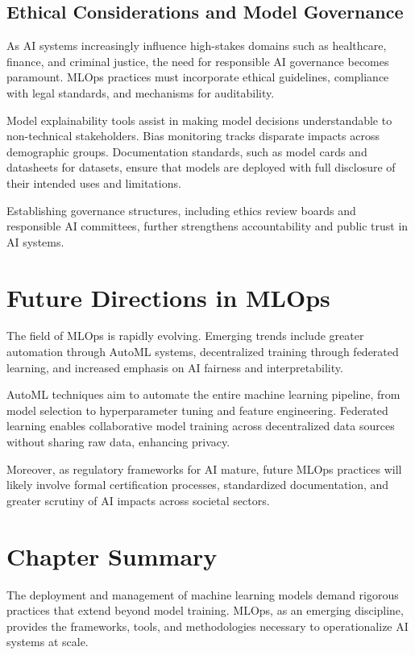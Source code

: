 \documentclass[openany]{book}
\begin{document}
\subsection{Ethical Considerations and Model Governance}
As AI systems increasingly influence high-stakes domains such as healthcare, 
finance, and criminal justice, the need for responsible AI governance becomes 
paramount. MLOps practices must incorporate ethical guidelines, compliance with 
legal standards, and mechanisms for auditability.

Model explainability tools assist in making model decisions understandable to
non-technical stakeholders. Bias monitoring tracks disparate impacts across 
demographic groups. Documentation standards, such as model cards and datasheets 
for datasets, ensure that models are deployed with full disclosure of their 
intended uses and limitations.

Establishing governance structures, including ethics review boards and 
responsible AI committees, further strengthens accountability and public trust 
in AI systems.

\section{Future Directions in MLOps}

The field of MLOps is rapidly evolving. Emerging trends include greater 
automation through AutoML systems, decentralized training through federated 
learning, and increased emphasis on AI fairness and interpretability.

AutoML techniques aim to automate the entire machine learning pipeline, from 
model selection to hyperparameter tuning and feature engineering. Federated 
learning enables collaborative model training across decentralized data sources 
without sharing raw data, enhancing privacy.

Moreover, as regulatory frameworks for AI mature, future MLOps practices will 
likely involve formal certification processes, standardized documentation, and 
greater scrutiny of AI impacts across societal sectors.

\section{Chapter Summary}

The deployment and management of machine learning models demand rigorous 
practices that extend beyond model training. MLOps, as an emerging discipline, 
provides the frameworks, tools, and methodologies necessary to operationalize 
AI systems at scale.
\end{document}
